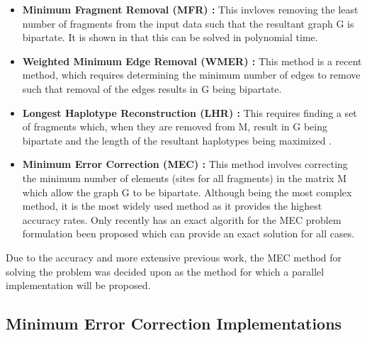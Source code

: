 \documentclass[10pt,twocolumn]{witseiepaper}
\begin{document}
\begin{itemize}
    \item{ \textbf{Minimum Fragment Removal (MFR) :} This invloves removing the least number of fragments 
            from the input data such that the resultant graph G is bipartate. It is shown in 
            \cite{lancia:2001} that this can be solved in polynomial time.
        }
\item{ \textbf{Weighted Minimum Edge Removal (WMER) \cite{aguiar:2012} :} This method is a recent method,
        which requires determining the minimum number of edges to remove such that removal of the edges
        results in G being bipartate.
    }
\item{ \textbf{Longest Haplotype Reconstruction (LHR) :} This requires finding a set of fragments which,
        when they are removed from M, result in G being bipartate and the length of the resultant 
        haplotypes being maximized \cite{schwartz:2010}. 
    }
\item{ \textbf{Minimum Error Correction (MEC) :} This method involves correcting the minimum number of 
        elements (sites for all fragments) in the matrix M which allow the graph G to be bipartate. 
        Although being the most complex method, it is the most widely used method as it provides the 
        highest accuracy rates. Only recently has an exact algorith for the MEC problem formulation been
        proposed which can provide an exact solution for all cases.
    }
\end{itemize}

Due to the accuracy and more extensive previous work, the MEC method for solving the problem was decided upon
as the method for which a parallel implementation will be proposed.

\subsection{ Minimum Error Correction Implementations } \label{sec:mecimp}
\end{document}
